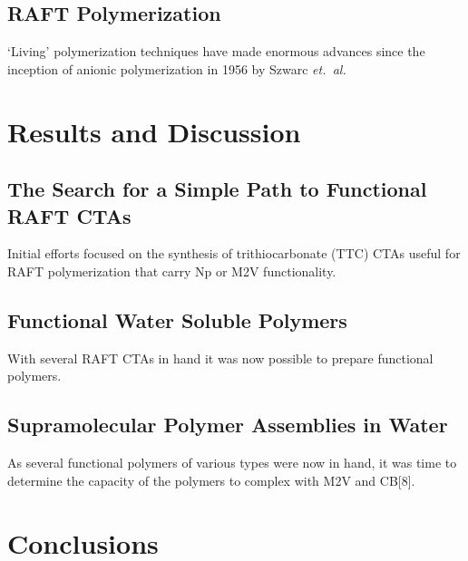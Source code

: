 \documentclass[a4paper,12pt]{report} %
\begin{document}
\section{RAFT Polymerization}

\noindent
`Living' polymerization techniques have made enormous advances since the inception of anionic polymerization in 1956 by Szwarc {\it et.~al.}~\cite{Szwarc:1956p46, Szwarc:1956p55} 




\chapter{Results and Discussion}



\section{The Search for a Simple Path to Functional RAFT CTAs}

\noindent
Initial efforts focused on the synthesis of trithiocarbonate (TTC) CTAs useful for RAFT polymerization that carry Np or M2V functionality.  



\section{Functional Water Soluble Polymers}

With several RAFT CTAs in hand it was now possible to prepare functional polymers.



\section{Supramolecular Polymer Assemblies in Water}


As several functional polymers of various types were now in hand, it was time to determine the capacity of the polymers to complex with M2V and CB[8].





\chapter{Conclusions}
\end{document}
